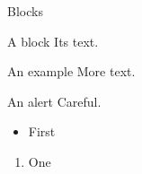 \documentclass{beamer}
\begin{document}
\begin{frame}{Blocks}
\begin{block}{A block}
Its text.
\end{block}
\begin{exampleblock}{An example}
More text.
\end{exampleblock}
\begin{alertblock}{An alert}
Careful.
\end{alertblock}
\begin{itemize}
\item First
\end{itemize}
\begin{enumerate}
\item One
\end{enumerate}
\end{frame}
\end{document}
